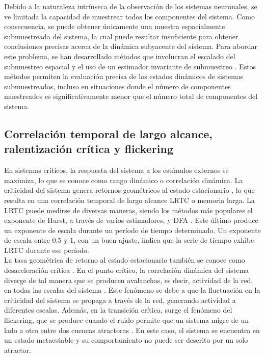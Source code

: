 Debido a la naturaleza intrínseca de la observación de los sistemas neuronales, se ve limitada la capacidad de muestrear todos los componentes del sistema. Como consecuencia, se puede obtener únicamente una muestra espacialmente submuestreada del sistema, la cual puede resultar insuficiente para obtener conclusiones precisas acerca de la dinámica subyacente del sistema. Para abordar este problema, se han desarrollado métodos que involucran el escalado del submuestreo espacial \cite{levina_subsampling_2017} y el uso de un estimador invariante de submuestreo \cite{wilting_inferring_2018}. Estos métodos permiten la evaluación precisa de los estados dinámicos de sistemas submuestreados, incluso en situaciones donde el número de componentes muestreados es significativamente menor que el número total de componentes del sistema.



\subsection{Correlación temporal de largo alcance, ralentización crítica y flickering}


En sistemas críticos, la respuesta del sistema a los estímulos externos se maximiza, lo que se conoce como rango dinámico o correlación dinámica. La criticidad del sistema genera retornos geométricos al estado estacionario \cite{hesse_self-organized_2014}, lo que resulta en una correlación temporal de largo alcance \gls{LRTC} o memoria larga. La \gls{LRTC} puede medirse de diversas maneras, siendo los métodos más populares el exponente de Hurst, a través de varios estimadores, y   \gls{DFA}  \cite{hardstone_detrended_2012}. Este último produce un exponente de escala durante un período de tiempo determinado. Un exponente de escala entre $0.5$ y $1$, con un buen ajuste, indica que la serie de tiempo exhibe \gls{LRTC} durante ese período.\\

La tasa geométrica de retorno al estado estacionario también se conoce como desaceleración crítica \cite{scheffer_early-warning_2009}. En el punto crítico, la correlación dinámica del sistema diverge de tal manera que se producen avalanchas, es decir, actividad de la red, en todas las escalas del sistema \cite{hesse_self-organized_2014}. Este fenómeno se debe a que la fluctuación en la criticidad del sistema se propaga a través de la red, generando actividad a diferentes escalas. Además, en la transición crítica, surge el fenómeno del flickering, que se produce cuando el ruido permite que un sistema migre de un lado a otro entre dos cuencas atractoras \cite{wang_flickering_2012}. En este caso, el sistema se encuentra en un estado metaestable y su comportamiento no puede ser descrito por un solo atractor.




